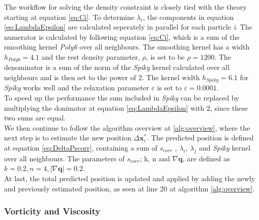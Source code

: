 The workflow for solving the density constraint is closely tied with the theory starting at equation \ref{eq:Ci}. 
To determine $\lambda_{i}$, the components in equation \ref{eq:LambdaEpsilon} are calculated seperately in parallel 
for each particle \textit{i}.
The numerator is calculated by following equation \ref{eq:Ci}, which is a sum of the smoothing kernel \textit{Poly6} over 
all neighbours. The smoothing kernel has a width $h_{Poly6} = 4.1$ and the rest density parameter, $\rho$, is set to be $\rho = 1200$. 
The denominator is a sum of the norm of the \textit{Spiky} kernel calculated over all neighbours 
and is then set to the power of 2. The kernel width $h_{Spiky} = 6.1$ for \textit{Spiky} works well and the 
relaxation parameter $\varepsilon$ is set to $\varepsilon = 0.0001$. 
\\
To speed up the performance the sum included in \textit{Spiky} can be replaced by multiplying the donimator at equation
\ref{eq:LambdaEpsilon} with 2, since these two sums are equal.
\\
\newline
We then continue to follow the algorithm overview at \ref{alg:overview}, where the next step is to estimate the new position $\Delta \mathbf{x}^{*}_{i}$.
The predicted position is defined at equation \ref{eq:DeltaPscorr}, containing a sum of $s_{corr}$ , $\lambda_{i}$, $\lambda_{j}$ 
and \textit{Spiky} kernel over all neighbours. 
The parameters of $s_{corr}$; k, n and $ \nabla \mathbf{q}$, are defined as $k = 0.2, n = 4, |\nabla \mathbf{q}| = 0.2$. 
\\
At last, the total predicted position is updated and applied by adding the newly and previously estimated position, 
as seen at line 20 at algorithm \ref{alg:overview}.

\subsubsection{Vorticity and Viscosity}
